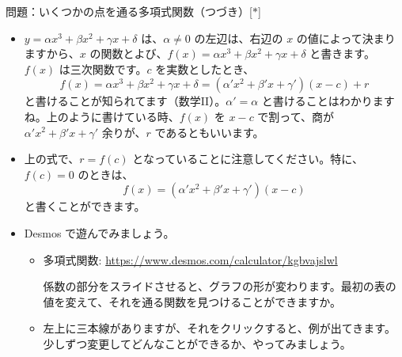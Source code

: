 \documentclass[10pt, dvipdfmx]{beamer}
\begin{document}
\begin{frame}{問題：いくつかの点を通る多項式関数（つづき）\hfill [$\ast$]}
\begin{itemize}
\item $y = \alpha x^3 + \beta x^2 + \gamma x + \delta$ は、$\alpha \neq 0$ の左辺は、右辺の $x$ の値によって決まりますから、$x$ の関数とよび、$f(x) = \alpha x^3 + \beta x^2 + \gamma x + \delta$ と書きます。$f(x)$ は三次関数です。$c$ を実数としたとき、
\[
f(x) = \alpha x^3 + \beta x^2 + \gamma x + \delta = (\alpha' x^2 + \beta' x + \gamma')(x-c) +r
\]
と書けることが知られてます（数学II）。$\alpha' = \alpha$ と書けることはわかりますね。上のように書けている時、$f(x)$ を $x-c$ で割って、商が $\alpha' x^2 + \beta' x + \gamma'$ 余りが、$r$ であるともいいます。
\item 上の式で、$r = f(c)$ となっていることに注意してください。特に、$f(c)=0$ のときは、
\[
f(x) = (\alpha' x^2 + \beta' x + \gamma')(x-c)
\]
と書くことができます。

\item Desmos で遊んでみましょう。
\begin{itemize}
\item 多項式関数: \url{https://www.desmos.com/calculator/kgbvajslwl} \par
係数の部分をスライドさせると、グラフの形が変わります。最初の表の値を変えて、それを通る関数を見つけることができますか。
\item 左上に三本線がありますが、それをクリックすると、例が出てきます。少しずつ変更してどんなことができるか、やってみましょう。
\end{itemize}
\end{itemize}
\end{frame}
\end{document}
